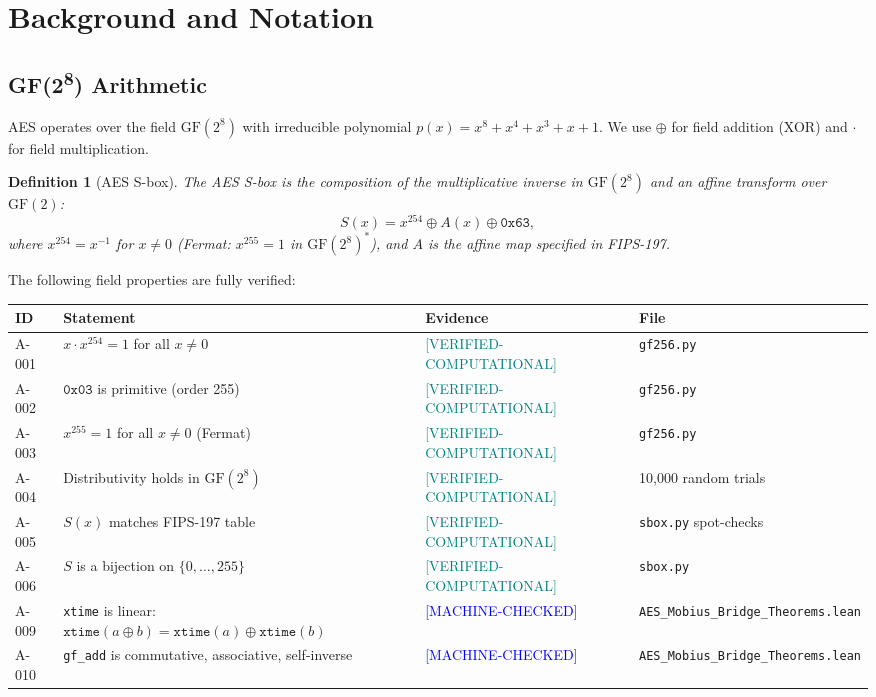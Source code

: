 \documentclass[11pt,letterpaper]{article}
\newtheorem{definition}[theorem]{Definition}
\newcommand{\MC}{\textcolor{blue}{[MACHINE-CHECKED]}}
\newcommand{\VC}{\textcolor{teal}{[VERIFIED-COMPUTATIONAL]}}
\begin{document}
\newpage

\section{Background and Notation}
\label{sec:background}

\subsection{GF(2\textsuperscript{8}) Arithmetic}

AES operates over the field $\mathrm{GF}(2^8)$ with irreducible polynomial
$p(x) = x^8 + x^4 + x^3 + x + 1$.  We use $\oplus$ for field addition (XOR)
and $\cdot$ for field multiplication.

\begin{definition}[AES S-box]
The AES S-box is the composition of the multiplicative inverse in $\mathrm{GF}(2^8)$
and an affine transform over $\mathrm{GF}(2)$:
\[
S(x) = x^{254} \oplus A(x) \oplus \mathtt{0x63},
\]
where $x^{254} = x^{-1}$ for $x \neq 0$ (Fermat: $x^{255} = 1$ in
$\mathrm{GF}(2^8)^*$), and $A$ is the affine map specified in FIPS-197.
\end{definition}

The following field properties are fully verified:

\begin{center}
\renewcommand{\arraystretch}{1.2}
\begin{tabular}{llll}
\toprule
ID & Statement & Evidence & File \\
\midrule
A-001 & $x \cdot x^{254} = 1$ for all $x \neq 0$ & \VC & \texttt{gf256.py} \\
A-002 & $\mathtt{0x03}$ is primitive (order 255) & \VC & \texttt{gf256.py} \\
A-003 & $x^{255} = 1$ for all $x \neq 0$ (Fermat) & \VC & \texttt{gf256.py} \\
A-004 & Distributivity holds in $\mathrm{GF}(2^8)$ & \VC & 10,000 random trials \\
A-005 & $S(x)$ matches FIPS-197 table & \VC & \texttt{sbox.py} spot-checks \\
A-006 & $S$ is a bijection on $\{0,\ldots,255\}$ & \VC & \texttt{sbox.py} \\
A-009 & \texttt{xtime} is linear: $\texttt{xtime}(a \oplus b) = \texttt{xtime}(a) \oplus \texttt{xtime}(b)$ & \MC & \texttt{AES\_Mobius\_Bridge\_Theorems.lean} \\
A-010 & \texttt{gf\_add} is commutative, associative, self-inverse & \MC & \texttt{AES\_Mobius\_Bridge\_Theorems.lean} \\
\bottomrule
\end{tabular}
\end{center}
\end{document}
